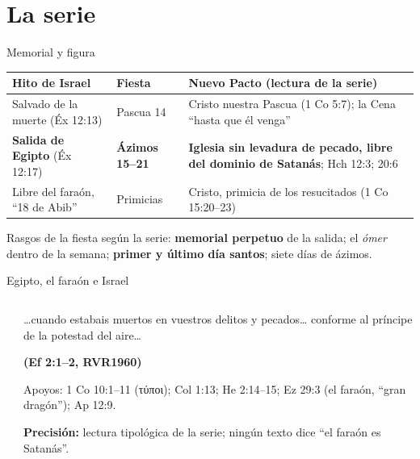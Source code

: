 \documentclass[hyperref={bookmarks=false},aspectratio=169]{beamer}
\newcommand{\grc}[1]{\foreignlanguage{ancientgreek}{#1}}
\newcommand{\fuente}[1]{\par\hfill{\upshape\bfseries\footnotesize\textcolor{tierraroja}{#1}}}
\newcommand{\destacar}[1]{\textbf{\textcolor{tierraroja}{#1}}}
\newcommand{\precision}[1]{{\footnotesize\color{sepia}\textbf{Precisión:} #1}}
\begin{document}
\section{La serie}

\begin{frame}{Memorial y figura}
\scriptsize\renewcommand{\arraystretch}{1.18}
\begin{tabular}{@{}L{3.4cm}L{2.0cm}L{6.6cm}@{}}
\toprule
\textbf{Hito de Israel} & \textbf{Fiesta} & \textbf{Nuevo Pacto (lectura de la serie)} \\ \midrule
Salvado de la muerte (Éx 12:13) & Pascua 14 & Cristo nuestra Pascua (1 Co 5:7); la Cena ``hasta que él venga'' \\
\textbf{Salida de Egipto} (Éx 12:17) & \textbf{Ázimos 15--21} & \textbf{Iglesia sin levadura de pecado, libre del dominio de Satanás}; Hch 12:3; 20:6 \\
Libre del faraón, ``18 de Abib'' & Primicias & Cristo, primicia de los resucitados (1 Co 15:20--23) \\
\bottomrule
\end{tabular}\par\medskip
\small Rasgos de la fiesta según la serie: \destacar{memorial perpetuo} de la salida; el \emph{ómer} dentro de la semana; \destacar{primer y último día santos}; siete días de ázimos.
\end{frame}

\begin{frame}{Egipto, el faraón e Israel}
\begin{columns}[t,onlytextwidth]
\begin{column}{0.50\textwidth}
\centering
{}
\end{column}
\begin{column}{0.48\textwidth}
\begin{cita}\ldots{}cuando estabais muertos en vuestros delitos y pecados\ldots{} conforme al príncipe de la potestad del aire\ldots\fuente{(Ef 2:1--2, RVR1960)}\end{cita}
\scriptsize Apoyos: 1 Co 10:1--11 (\grc{τύποι}); Col 1:13; He 2:14--15; Ez 29:3 (el faraón, ``gran dragón''); Ap 12:9.\par
\precision{lectura tipológica de la serie; ningún texto dice ``el faraón es Satanás''.}
\end{column}
\end{columns}
\end{frame}
\end{document}
